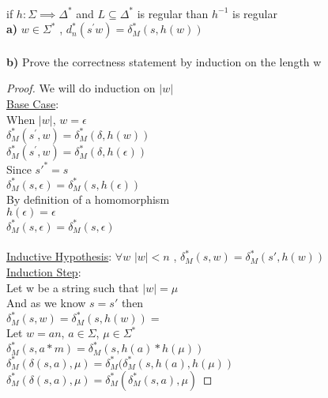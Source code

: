 \documentclass[12pt]{article}
\newcommand{\boner}{\delta_{M}^{*}}
\newenvironment{problem}[2][Problem]{\begin{trivlist}
\item[\hskip \labelsep {\bfseries #1}\hskip \labelsep {\bfseries #2.}]}{\end{trivlist}}
\begin{document}
\begin{problem}{2}\\
if $h:\Sigma \implies \Delta^*$ and $L \subseteq \Delta^*$ is regular than $h^{-1} $ is regular\\ 
\textbf{a)}
$w \in \Sigma^*$ , $ d_{n}^*(s^{'}w) = \delta_{M}^{*}(s, h(w)) $\\ 
\\ \textbf{b)} Prove the correctness statement by induction on the length w	\\
\begin{proof}
We will do induction on $|w|$\\ 
\underline{Base Case}: \\
When $|w|$, $ w=\epsilon $\\
$\boner(s^{'},w) = \boner(\delta, h(w))$\\
$\boner(s^{'},w) = \boner(\delta, h(\epsilon)) $\\ \linebreak
Since $s'^{*} = s$\\
$\boner (s,\epsilon)= \boner(s,h(\epsilon)) $\\ \linebreak
By definition of a homomorphism\\ 
$h(\epsilon) = \epsilon$\\
$\boner(s,\epsilon) = \boner(s,\epsilon)$ \\ \\
\underline{Inductive Hypothesis}: $\forall w $  $ |w| < n$ , $\boner(s,w) = \boner(s',h(w))$ 
\\ \underline{Induction Step}:\\
Let w be a string such that $|w|=\mu$\\
And as we know $s=s'$ then \\
$\boner(s,w) = \boner(s,h(w))=$\\
Let $w=an$, $a \in \Sigma $, $\mu \in \Sigma^*$\\
$\boner(s,a*m) = \boner(s, h(a)*h(\mu))$\\
$\boner(\delta(s,a),\mu) = \boner(\boner(s,h(a), h(\mu))$\\
$\boner(\delta(s,a),\mu) = \boner(\boner(s,a),\mu)$

\end{proof}
\end{problem}
\end{document}
